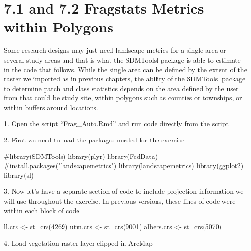 \documentclass[
  letterpaper,
]{book}
\newenvironment{Shaded}{\begin{snugshade}}{\end{snugshade}}
\newcommand{\CommentTok}[1]{\textcolor[rgb]{0.37,0.37,0.37}{#1}}
\newcommand{\DecValTok}[1]{\textcolor[rgb]{0.68,0.00,0.00}{#1}}
\newcommand{\FunctionTok}[1]{\textcolor[rgb]{0.28,0.35,0.67}{#1}}
\newcommand{\NormalTok}[1]{\textcolor[rgb]{0.00,0.23,0.31}{#1}}
\newcommand{\OtherTok}[1]{\textcolor[rgb]{0.00,0.23,0.31}{#1}}
\begin{document}
\hypertarget{and-7.2-fragstats-metrics-within-polygons}{%
\section{7.1 and 7.2 Fragstats Metrics within
Polygons}\label{and-7.2-fragstats-metrics-within-polygons}}

Some research designs may just need landscape metrics for a single area
or several study areas and that is what the SDMToolsl package is able to
estimate in the code that follows. While the single area can be defined
by the extent of the raster we imported as in previous chapters, the
ability of the SDMToolsl package to determine patch and class statistics
depends on the area defined by the user from that could be study site,
within polygons such as counties or townships, or within buffers around
locations.

1. Open the script ``Frag\_Auto.Rmd'' and run code directly from the
script

2. First we need to load the packages needed for the exercise

\begin{Shaded}
\begin{Highlighting}[]
\CommentTok{\#library(SDMTools)}
\FunctionTok{library}\NormalTok{(plyr)}
\FunctionTok{library}\NormalTok{(FedData)}
\CommentTok{\#install.packages("landscapemetrics")}
\FunctionTok{library}\NormalTok{(landscapemetrics)}
\FunctionTok{library}\NormalTok{(ggplot2)}
\FunctionTok{library}\NormalTok{(sf)}
\end{Highlighting}
\end{Shaded}

3. Now let's have a separate section of code to include projection
information we will use throughout the exercise. In previous versions,
these lines of code were within each block of code

\begin{Shaded}
\begin{Highlighting}[]
\NormalTok{ll.crs }\OtherTok{\textless{}{-}} \FunctionTok{st\_crs}\NormalTok{(}\DecValTok{4269}\NormalTok{)}
\NormalTok{utm.crs }\OtherTok{\textless{}{-}} \FunctionTok{st\_crs}\NormalTok{(}\DecValTok{9001}\NormalTok{)}
\NormalTok{albers.crs }\OtherTok{\textless{}{-}} \FunctionTok{st\_crs}\NormalTok{(}\DecValTok{5070}\NormalTok{)}
\end{Highlighting}
\end{Shaded}

4. Load vegetation raster layer clipped in ArcMap
\end{document}
